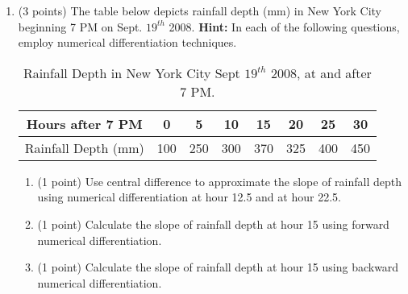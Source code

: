 \documentclass{article}%
\begin{document}
\begin{enumerate}
\item (3 points) The table below depicts rainfall depth (mm) in New York City beginning 7 PM on Sept. $19^{th}$ 2008. \textbf{Hint:} In each of the following questions, employ numerical differentiation techniques.
\vspace{5ex}
\begin{table}[!ht]
    \centering
    \begin{tabular}{c|c|c|c|c|c|c|c}
         \midrule 
         Hours after 7 PM&0&5&10&15&20&25&30\\\hline
         \vspace{0.5ex}Rainfall Depth (mm)&100&250&300&370&325&400&450\\\bottomrule
    \end{tabular}
    \caption{Rainfall Depth in New York City Sept $19^{th}$ 2008, at and after 7 PM.}
    \label{tab:rainfall_table}
\end{table}
\begin{enumerate}
    \item (1 point) Use central difference to approximate the slope of rainfall depth using numerical differentiation at hour 12.5 and at hour 22.5.
    \item (1 point) Calculate the slope of rainfall depth at hour 15 using forward numerical differentiation.
    \item (1 point) Calculate the slope of rainfall depth at hour 15 using backward numerical differentiation.
    \end{enumerate}
\end{enumerate}
\end{document}
